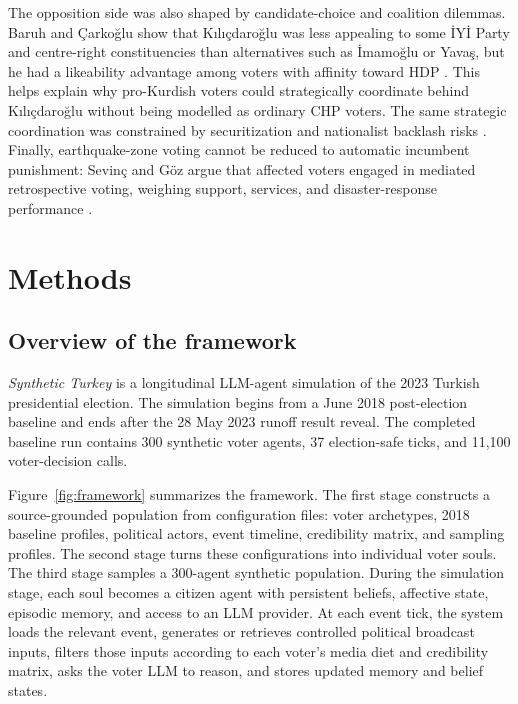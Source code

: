 \documentclass[pdflatex,sn-mathphys-num,iicol]{sn-jnl}
\begin{document}
The opposition side was also shaped by candidate-choice and coalition dilemmas. Baruh and Çarkoğlu show that Kılıçdaroğlu was less appealing to some İYİ Party and centre-right constituencies than alternatives such as İmamoğlu or Yavaş, but he had a likeability advantage among voters with affinity toward HDP \cite{baruh2024difficult}. This helps explain why pro-Kurdish voters could strategically coordinate behind Kılıçdaroğlu without being modelled as ordinary CHP voters. The same strategic coordination was constrained by securitization and nationalist backlash risks \cite{ilbiz2023securitization}. Finally, earthquake-zone voting cannot be reduced to automatic incumbent punishment: Sevinç and Göz argue that affected voters engaged in mediated retrospective voting, weighing support, services, and disaster-response performance \cite{sevinc2024afet}.

\section{Methods}\label{sec:methods}

\subsection{Overview of the framework}\label{subsec:framework}

\textit{Synthetic Turkey} is a longitudinal LLM-agent simulation of the 2023 Turkish presidential election. The simulation begins from a June 2018 post-election baseline and ends after the 28 May 2023 runoff result reveal. The completed baseline run contains 300 synthetic voter agents, 37 election-safe ticks, and 11,100 voter-decision calls.

Figure~\ref{fig:framework} summarizes the framework. The first stage constructs a source-grounded population from configuration files: voter archetypes, 2018 baseline profiles, political actors, event timeline, credibility matrix, and sampling profiles. The second stage turns these configurations into individual voter souls. The third stage samples a 300-agent synthetic population. During the simulation stage, each soul becomes a citizen agent with persistent beliefs, affective state, episodic memory, and access to an LLM provider. At each event tick, the system loads the relevant event, generates or retrieves controlled political broadcast inputs, filters those inputs according to each voter's media diet and credibility matrix, asks the voter LLM to reason, and stores updated memory and belief states.
\end{document}
